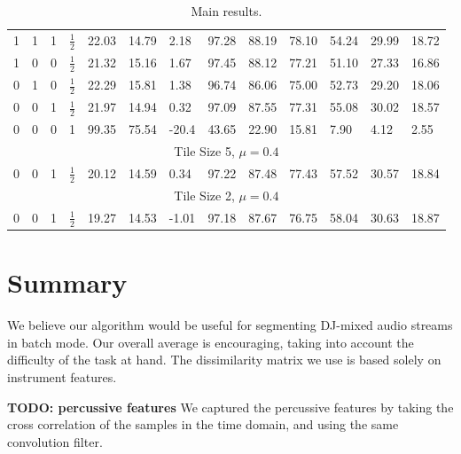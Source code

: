 \documentclass[twocolumn]{article}
\begin{document}
\begin{table}[t]
\begin{tabular}{lllllllllllll}
1 & 1 & 1 & $\frac{1}{2}$ &  22.03    &   14.79        &   2.18     &  97.28   &  88.19   & 78.10    & 54.24    & 29.99   & 18.72   \\ [1ex]
1 & 0 & 0 & $\frac{1}{2}$ &  21.32    &   15.16        &   1.67     &  97.45   &  88.12   & 77.21    & 51.10    & 27.33   & 16.86   \\ [1ex]
0 & 1 & 0 & $\frac{1}{2}$ &  22.29    &   15.81        &   1.38     &  96.74   &  86.06   & 75.00    & 52.73    & 29.20   & 18.06   \\ [1ex]
0 & 0 & 1 & $\frac{1}{2}$ &  21.97    &   14.94        &   0.32     &  97.09   &  87.55   & 77.31    & 55.08    & 30.02   & 18.57   \\ [1ex]
0 & 0 & 0 & 1             &  99.35    &   75.54        &   -20.4    &  43.65   &  22.90   & 15.81    & 7.90     & 4.12    & 2.55  \vspace{0.3cm} \\ 
	

\multicolumn{13}{c}{{Tile Size 5}, $\mu=0.4$}    \vspace{0.3cm}      
\\

0& 0 & 1 & $\frac{1}{2}$ &   20.12   &    14.59       &   0.34    &  97.22   &  87.48   &  77.43   &  57.52   & 30.57  &  18.84  \\ [1ex]

\multicolumn{13}{c}{{Tile Size 2}, $\mu=0.4$}    \vspace{0.3cm}      
\\

0& 0 & 1 & $\frac{1}{2}$ &   19.27   &    14.53       &   -1.01    &  97.18   &  87.67   &  76.75   &  58.04   & 30.63  &  18.87  \\ [1ex]

	\hline 
	\end{tabular}
\caption{Main results.}
\end{table}


\section{Summary}\label{conclusions}

We believe our algorithm would be useful for segmenting DJ-mixed audio streams in batch mode. Our overall average is encouraging, taking into account the difficulty of the task at hand. The dissimilarity matrix we use is based solely on instrument features. 

\textbf{TODO: percussive features}
We captured the percussive features by taking the cross correlation of the samples in the time domain, and using the same convolution filter. 
\end{document}
